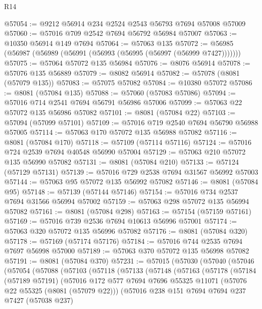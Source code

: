 \begin{lexlean}{R14}
\begin{coremodule}
@57054 := @9212 @56914 @234 @2524 @2543 @56793 @7694 @57008 @57009
@57060 := @57016 @709 @2542 @7694 @56792 @56984 @57007
@57063 := @10350 @56914 @149 @7694
@57064 := @57063 @135
@57072 := @56985 (@56987 (@56989 (@56991 (@56993 (@56995 (@56997 (@56999 @7427)))))))
@57075 := @57064 @57072 @135 @56984
@57076 := @8076 @56914
@57078 := @57076 @135 @56889
@57079 := @8082 @56914
@57082 := @57078 (@8081 (@57079 @135))
@57083 := @57075 @57082
@57084 := @10380 @57072
@57086 := @8081 (@57084 @135)
@57088 := @57060 (@57083 @57086)
@57094 := @57016 @714 @2541 @7694 @56791 @56986 @57006
@57099 := @57063 @22 @57072 @135 @56986 @57082
@57101 := @8081 (@57084 @22)
@57103 := @57094 (@57099 @57101)
@57109 := @57016 @719 @2540 @7694 @56790 @56988 @57005
@57114 := @57063 @170 @57072 @135 @56988 @57082
@57116 := @8081 (@57084 @170)
@57118 := @57109 (@57114 @57116)
@57124 := @57016 @724 @2539 @7694 @40548 @56990 @57004
@57129 := @57063 @210 @57072 @135 @56990 @57082
@57131 := @8081 (@57084 @210)
@57133 := @57124 (@57129 @57131)
@57139 := @57016 @729 @2538 @7694 @31567 @56992 @57003
@57144 := @57063 @95 @57072 @135 @56992 @57082
@57146 := @8081 (@57084 @95)
@57148 := @57139 (@57144 @57146)
@57154 := @57016 @734 @2537 @7694 @31566 @56994 @57002
@57159 := @57063 @298 @57072 @135 @56994 @57082
@57161 := @8081 (@57084 @298)
@57163 := @57154 (@57159 @57161)
@57169 := @57016 @739 @2536 @7694 @10613 @56996 @57001
@57174 := @57063 @320 @57072 @135 @56996 @57082
@57176 := @8081 (@57084 @320)
@57178 := @57169 (@57174 @57176)
@57184 := @57016 @744 @2535 @7694 @7697 @56998 @57000
@57189 := @57063 @370 @57072 @135 @56998 @57082
@57191 := @8081 (@57084 @370)
@57231 := @57015
    (@57030
      (@57040
        (@57046
          (@57054
            (@57088
              (@57103
                (@57118
                  (@57133
                    (@57148
                      (@57163
                        (@57178
                          (@57184
                            (@57189 @57191)
                            (@57016
                              @172
                              @577
                              @7694
                              @7696
                              @55325
                              @11071
                              (@57076 @22 @55325 (@8081 (@57079 @22)))
                              (@57016
                                @238
                                @151
                                @7694
                                @7694
                                @237
                                @7427
                                (@57038 @237)

\end{coremodule}
\end{lexlean}
